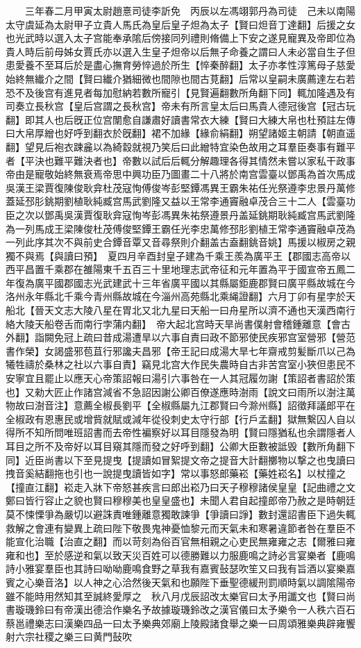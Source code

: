 　　三年春二月甲寅太尉趙憙司徒李訢免　丙辰以左馮翊郭丹為司徒　己未以南陽太守虞延為太尉甲子立貴人馬氏為皇后皇子炟為太子【賢曰炟音丁達翻】后援之女也光武時以選入太子宫能奉承隂后傍接同列禮則脩備上下安之遂見寵異及帝即位為貴人時后前母姊女賈氏亦以選入生皇子炟帝以后無子命養之謂曰人未必當自生子但患愛養不至耳后於是盡心撫育勞悴過於所生【悴秦醉翻】太子亦孝性淳篤母子慈愛始終無纎介之間【賢曰纎介猶細微也間隙也間古莧翻】后常以皇嗣未廣薦達左右若恐不及後宫有進見者每加慰納若數所寵引【見賢遍翻數所角翻下同】輒加隆遇及有司奏立長秋宫【皇后宫謂之長秋宫】帝未有所言皇太后曰馬貴人德冠後宫【冠古玩翻】即其人也后旣正位宫闈愈自謙肅好讀書常衣大練【賢曰大練大帛也杜預註左傳曰大帛厚繒也好呼到翻衣於旣翻】裙不加緣【緣俞絹翻】朔望諸姬主朝請【朝直遥翻】望見后袍衣踈麄以為綺縠就視乃笑后曰此繒特宜染色故用之耳羣臣奏事有難平者【平決也難平難決者也】帝數以試后后輒分解趣理各得其情然未嘗以家私干政事帝由是寵敬始終無衰焉帝思中興功臣乃圖畫二十八將於南宫雲臺以鄧禹為首次馬成吳漢王梁賈復陳俊耿弇杜茂寇恂傅俊岑彭堅鐔馮異王霸朱祐任光祭遵李忠景丹萬修蓋延邳肜銚期劉植耿純臧宫馬武劉隆又益以王常李通竇融卓茂合三十二人【雲臺功臣之次以鄧禹吳漢賈復耿弇寇恂岑彭馮異朱祐祭遵景丹盖延銚期耿純臧宫馬武劉隆為一列馬成王梁陳俊杜茂傅俊堅鐔王霸任光李忠萬修邳肜劉植王常李通竇融卓茂為一列此序其次不與前史合鐔音覃又音尋祭則介翻盖古盍翻銚音姚】馬援以椒房之親獨不與焉【與讀曰預】　夏四月辛酉封皇子建為千乘王羨為廣平王【郡國志高帝以西平昌置千乘郡在雒陽東千五百三十里地理志武帝征和元年置為平于國宣帝五鳳二年復為廣平國郡國志光武建武十三年省廣平國以其縣屬鉅鹿郡賢曰廣平縣故城在今洛州永年縣北千乘今青州縣故城在今淄州高苑縣北乘䋲證翻】六月丁卯有星孛於天船北【晉天文志大陵八星在胃北又北九星曰天船一曰舟星所以濟不通也天漢西南行絡大陵天船卷舌而南行孛蒲内翻】　帝大起北宫時天旱尚書僕射會稽鍾離意【會古外翻】詣闕免冠上疏曰昔成湯遭旱以六事自責曰政不節邪使民疾邪宫室營邪【營范書作榮】女謁盛邪苞苴行邪讒夫昌邪【帝王記曰成湯大旱七年齋戒剪髪斷爪以己為犧牲禱於桑林之社以六事自責】竊見北宫大作民失農時自古非苦宫室小狹但患民不安寧宜且罷止以應天心帝策詔報曰湯引六事咎在一人其冠履勿謝【策詔者書詔於策也】又勑大匠止作諸宫減省不急詔因謝公卿百僚遂應時澍雨【說文曰雨所以澍注萬物故曰澍音注】意薦全椒長劉平【全椒縣屬九江郡賢曰今滁州縣】詔徵拜議郎平在全椒政有恩惠民或增貲就賦或減年從役刺史太守行部【行戶孟翻】獄無繋囚人自以得所不知所問唯班詔書而去帝性褊察好以耳目隱發為明【賢曰隱猶私也余謂隱者人耳目之所不及帝好以耳目窺其隱而發之好呼到翻】公卿大臣數被詆毁【數所角翻下同】近臣尚書以下至見提曳【提讀如冒絮提文帝之提音大計翻擲物以撃之也曳讀曰拽音奚結翻拖也引也一說提曳讀皆如字】常以事怒郎藥崧【藥姓崧名】以杖撞之【撞直江翻】崧走入牀下帝怒甚疾言曰郎出崧乃曰天子穆穆諸侯皇皇【記曲禮之文鄭曰皆行容止之貌也賢曰穆穆美也皇皇盛也】未聞人君自起撞郎帝乃赦之是時朝廷莫不悚慄爭為嚴切以避誅責唯鍾離意獨敢諫爭【爭讀曰諍】數封還詔書臣下過失輒救解之會連有變異上疏曰陛下敬畏鬼神憂恤黎元而天氣未和寒暑違節者咎在羣臣不能宣化治職【治直之翻】而以苛刻為俗百官無相親之心吏民無雍雍之志【爾雅曰雍雍和也】至於感逆和氣以致天災百姓可以德勝難以力服鹿鳴之詩必言宴樂者【鹿鳴詩小雅宴羣臣也其詩曰呦呦鹿鳴食野之草我有嘉賓鼔瑟吹笙又曰我有旨酒以宴樂嘉賓之心樂音洛】以人神之心洽然後天氣和也願陛下垂聖德緩刑罰順時氣以調隂陽帝雖不能時用然知其至誠終愛厚之　秋八月戊辰詔改太樂官曰太予用讖文也【賢曰尚書璇璣鈴曰有帝漢出德洽作樂名予故據璇璣鈴改之漢官儀曰太予樂令一人秩六百石蔡邕禮樂志曰漢樂四品一曰太予樂典郊廟上陵殿諸食舉之樂一曰周頌雅樂典辟雍饗射六宗社稷之樂三曰黄門鼔吹